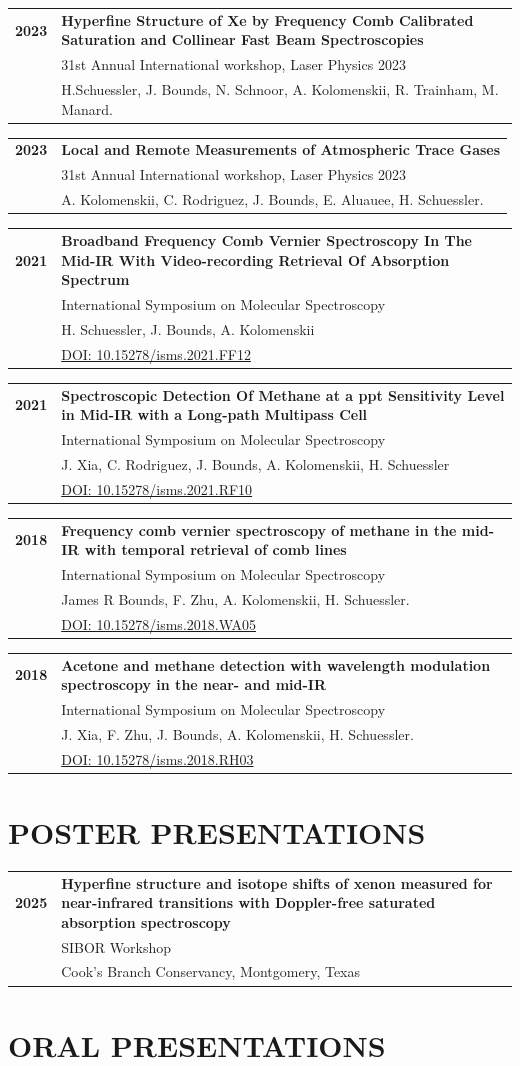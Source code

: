 \documentclass[a4paper,9pt]{extarticle}
\makeatletter
\newcommand{\cventryy}[4]{
	\noindent
	\begin{tabular*}{\textwidth}{@{\extracolsep{\fill}}p{0.6cm}p{14.7cm}}
		\textbf{#1} &
		\textbf{#2}\\
		&
		#3\\
		&
		#4\\[0.8em]
	\end{tabular*}
}
\newcommand{\cventryyy}[5]{
	\noindent
	\begin{tabular*}{\textwidth}{@{\extracolsep{\fill}}p{0.6cm}p{14.7cm}}
		\textbf{#1} &
		\textbf{#2}\\
		&
		#3\\
		&
		#4\\
		&
		#5\\[0.8em]
	\end{tabular*}
}
\makeatother
\begin{document}
	\cventryy
	{2023}
	{Hyperfine Structure of Xe by Frequency Comb Calibrated Saturation and Collinear Fast Beam Spectroscopies}
	{31st Annual International workshop, Laser Physics 2023}
	{H.Schuessler, J. Bounds, N. Schnoor, A. Kolomenskii, R. Trainham, M. Manard.}
	
	\cventryy
	{2023}
	{Local and Remote Measurements of Atmospheric Trace Gases}
	{31st Annual International workshop, Laser Physics 2023}
	{A. Kolomenskii, C. Rodriguez, J. Bounds, E. Aluauee, H. Schuessler.}
	
	\cventryyy
	{2021}
	{Broadband Frequency Comb Vernier Spectroscopy In The Mid-IR With Video-recording Retrieval Of Absorption Spectrum}
	{International Symposium on Molecular Spectroscopy}
	{H. Schuessler, J. Bounds, A. Kolomenskii}
	{\href{http://hdl.handle.net/2142/111474}{DOI: 10.15278/isms.2021.FF12}}
	
	\cventryyy
	{2021}
	{Spectroscopic Detection Of Methane at a ppt Sensitivity Level in Mid-IR with a Long-path Multipass Cell}
	{International Symposium on Molecular Spectroscopy}
	{J. Xia, C. Rodriguez, J. Bounds, A. Kolomenskii, H. Schuessler}
	{\href{http://hdl.handle.net/2142/111469}{DOI: 10.15278/isms.2021.RF10}}
	
	\cventryyy
	{2018}
	{Frequency comb vernier spectroscopy of methane in the mid-IR with temporal retrieval of comb lines}
	{International Symposium on Molecular Spectroscopy}
	{James R Bounds, F. Zhu, A. Kolomenskii, H. Schuessler.}
	{\href{http://hdl.handle.net/2142/100480}{DOI: 10.15278/isms.2018.WA05}}
	
	\cventryyy
	{2018}
	{Acetone and methane detection with wavelength modulation spectroscopy in the near- and mid-IR}
	{International Symposium on Molecular Spectroscopy}
	{J. Xia, F. Zhu, J. Bounds, A. Kolomenskii, H. Schuessler.}
	{\href{http://hdl.handle.net/2142/100674}{DOI: 10.15278/isms.2018.RH03}}
	
	\section*{POSTER PRESENTATIONS}
	\cventryy
	{2025}
	{Hyperfine structure and isotope shifts of xenon measured for near-infrared transitions with Doppler-free saturated absorption spectroscopy}
	{SIBOR Workshop}
	{Cook's Branch Conservancy, Montgomery, Texas}
	
	\section*{ORAL PRESENTATIONS}
	
\end{document}
